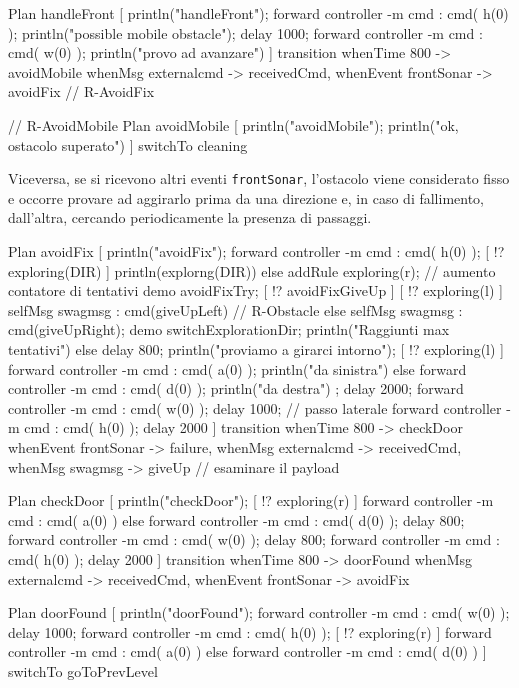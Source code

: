\documentclass{../llncs}
\newcommand{\codescript}[1]{{\mbox{\small{\texttt{#1}}}}\xspace}
\begin{document}
\begin{qacode}[caption={SoftwareAgent, pt6}]
Plan handleFront [
	println("handleFront");
	forward controller -m cmd : cmd( h(0) );
	println("possible mobile obstacle");
	delay 1000;
	forward controller -m cmd : cmd( w(0) );
	println("provo ad avanzare")
]
transition
	whenTime 800 -> avoidMobile
	whenMsg externalcmd -> receivedCmd,
	whenEvent frontSonar -> avoidFix // R-AvoidFix
 
 // R-AvoidMobile
 Plan avoidMobile [
	println("avoidMobile");
	println("ok, ostacolo superato")
]
switchTo cleaning
\end{qacode}

Viceversa, se si ricevono altri eventi \codescript{frontSonar}, l'ostacolo viene considerato fisso e occorre provare ad aggirarlo prima da una direzione e, in caso di fallimento, dall'altra, cercando periodicamente la presenza di passaggi.\\

\begin{qacode}[caption={SoftwareAgent, pt7}]
Plan avoidFix [
	println("avoidFix");
	forward controller -m cmd : cmd( h(0) );
	[ !? exploring(DIR) ] println(explorng(DIR))
	else addRule exploring(r);
	// aumento contatore di tentativi
	demo avoidFixTry;
	[ !? avoidFixGiveUp ] {
		[ !? exploring(l) ] selfMsg swagmsg : cmd(giveUpLeft) // R-Obstacle
		else selfMsg swagmsg : cmd(giveUpRight);
		demo switchExplorationDir;
		println("Raggiunti max tentativi")
	} else {
		delay 800;
		println("proviamo a girarci intorno");
		[ !? exploring(l) ] {
			forward controller -m cmd : cmd( a(0) );
			println("da sinistra")
		}
		else {
			forward controller -m cmd : cmd( d(0) );
			println("da destra")
		};
		delay 2000;
		forward controller -m cmd : cmd( w(0) );
		delay 1000; // passo laterale
		forward controller -m cmd : cmd( h(0) );
		delay 2000
	}
]
transition
	whenTime 800 -> checkDoor
	whenEvent frontSonar -> failure,
	whenMsg externalcmd -> receivedCmd,
	whenMsg swagmsg -> giveUp // esaminare il payload

Plan checkDoor [
	println("checkDoor");
	[ !? exploring(r) ] forward controller -m cmd : cmd( a(0) )
	else forward controller -m cmd : cmd( d(0) );
	delay 800;
	forward controller -m cmd : cmd( w(0) );
	delay 800;
	forward controller -m cmd : cmd( h(0) );
	delay 2000
]
transition
	whenTime 800 -> doorFound
	whenMsg externalcmd -> receivedCmd,
	whenEvent frontSonar -> avoidFix

Plan doorFound [
	println("doorFound");
	forward controller -m cmd : cmd( w(0) );
	delay 1000;
	forward controller -m cmd : cmd( h(0) );
	[ !? exploring(r) ] forward controller -m cmd : cmd( a(0) )
	else forward controller -m cmd : cmd( d(0) )
]
switchTo goToPrevLevel
\end{qacode}
\end{document}
